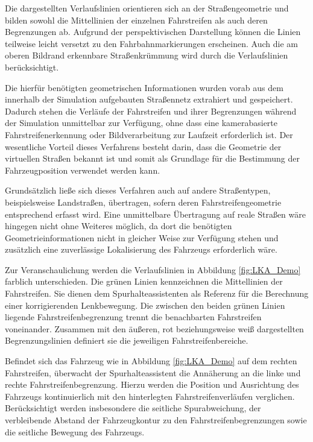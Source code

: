 Die dargestellten Verlaufslinien orientieren sich an der Straßengeometrie und bilden sowohl die Mittellinien der einzelnen Fahrstreifen als auch deren Begrenzungen ab. Aufgrund der perspektivischen Darstellung können die Linien teilweise leicht versetzt zu den Fahrbahnmarkierungen erscheinen. Auch die am oberen Bildrand erkennbare Straßenkrümmung wird durch die Verlaufslinien berücksichtigt.

Die hierfür benötigten geometrischen Informationen wurden vorab aus dem innerhalb der Simulation aufgebauten Straßennetz extrahiert und gespeichert. Dadurch stehen die Verläufe der Fahrstreifen und ihrer Begrenzungen während der Simulation unmittelbar zur Verfügung, ohne dass eine kamerabasierte Fahrstreifenerkennung oder Bildverarbeitung zur Laufzeit erforderlich ist. Der wesentliche Vorteil dieses Verfahrens besteht darin, dass die Geometrie der virtuellen Straßen bekannt ist und somit als Grundlage für die Bestimmung der Fahrzeugposition verwendet werden kann.

Grundsätzlich ließe sich dieses Verfahren auch auf andere Straßentypen, beispielsweise Landstraßen, übertragen, sofern deren Fahrstreifengeometrie entsprechend erfasst wird. Eine unmittelbare Übertragung auf reale Straßen wäre hingegen nicht ohne Weiteres möglich, da dort die benötigten Geometrieinformationen nicht in gleicher Weise zur Verfügung stehen und zusätzlich eine zuverlässige Lokalisierung des Fahrzeugs erforderlich wäre.

Zur Veranschaulichung werden die Verlaufslinien in Abbildung \ref{fig:LKA_Demo} farblich unterschieden. Die grünen Linien kennzeichnen die Mittellinien der Fahrstreifen. Sie dienen dem Spurhalteassistenten als Referenz für die Berechnung einer korrigierenden Lenkbewegung. Die zwischen den beiden grünen Linien liegende Fahrstreifenbegrenzung trennt die benachbarten Fahrstreifen voneinander. Zusammen mit den äußeren, rot beziehungsweise weiß dargestellten Begrenzungslinien definiert sie die jeweiligen Fahrstreifenbereiche.

Befindet sich das Fahrzeug wie in Abbildung \ref{fig:LKA_Demo} auf dem rechten Fahrstreifen, überwacht der Spurhalteassistent die Annäherung an die linke und rechte Fahrstreifenbegrenzung. Hierzu werden die Position und Ausrichtung des Fahrzeugs kontinuierlich mit den hinterlegten Fahrstreifenverläufen verglichen. Berücksichtigt werden insbesondere die seitliche Spurabweichung, der verbleibende Abstand der Fahrzeugkontur zu den Fahrstreifenbegrenzungen sowie die seitliche Bewegung des Fahrzeugs.

